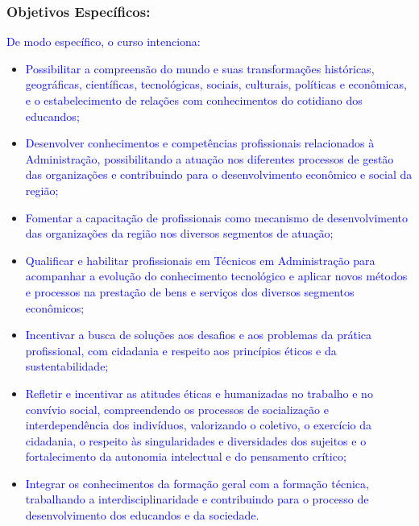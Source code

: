 \documentclass{../../modelos/latex-shared/ifsc-ppc}
\newcommand{\revisao}[1]{\textcolor{blue}{#1}}
\newcommand{\revisao}[1]{#1}
\begin{document}
\subsubsection{Objetivos Específicos:}
\revisao{De modo específico, o curso intenciona:}
\begin{itemize}
    \item \revisao{Possibilitar a compreensão do mundo e suas transformações históricas, geográficas, científicas, tecnológicas, sociais, culturais, políticas e econômicas, e o estabelecimento de relações com conhecimentos do cotidiano dos educandos;}
    \item \revisao{Desenvolver conhecimentos e competências profissionais relacionados à Administração, possibilitando a atuação nos diferentes processos de gestão das organizações e contribuindo para o desenvolvimento econômico e social da região;}
    \item \revisao{Fomentar a capacitação de profissionais como mecanismo de desenvolvimento das organizações da região nos diversos segmentos de atuação;}
    \item \revisao{Qualificar e habilitar profissionais em Técnicos em Administração para acompanhar a evolução do conhecimento tecnológico e aplicar novos métodos e processos na prestação de bens e serviços dos diversos segmentos econômicos;}
    \item \revisao{Incentivar a busca de soluções aos desafios e aos problemas da prática profissional, com cidadania e respeito aos princípios éticos e da sustentabilidade;}
    \item \revisao{Refletir e incentivar as atitudes éticas e humanizadas no trabalho e no convívio social, compreendendo os processos de socialização e interdependência dos indivíduos, valorizando o coletivo, o exercício da cidadania, o respeito às singularidades e diversidades dos sujeitos e o fortalecimento da autonomia intelectual e do pensamento crítico;}
    \item \revisao{Integrar os conhecimentos da formação geral com a formação técnica, trabalhando a interdisciplinaridade e contribuindo para o processo de desenvolvimento dos educandos e da sociedade.}
\end{itemize}
\end{document}
